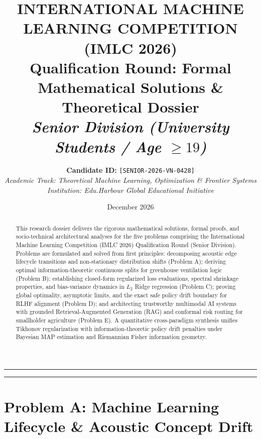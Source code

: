 \documentclass[11pt,a4paper]{article}
\title{\vspace{-1.2cm}\Large\textbf{INTERNATIONAL MACHINE LEARNING COMPETITION (IMLC 2026)}\\[0.3cm]
\large\textbf{Qualification Round: Formal Mathematical Solutions \& Theoretical Dossier}\\[0.1cm]
\normalsize\textit{Senior Division (University Students / Age $\ge 19$)}}
\author{\textbf{Candidate ID:} \texttt{[SENIOR-2026-VN-0428]} \\
\textit{Academic Track: Theoretical Machine Learning, Optimization \& Frontier Systems} \\
\textit{Institution: Edu.Harbour Global Educational Initiative}}
\date{December 2026}
\theoremstyle{definition}
\theoremstyle{plain}
\theoremstyle{remark}
\begin{document}
\maketitle
\thispagestyle{fancy}

\begin{abstract}
This research dossier delivers the rigorous mathematical solutions, formal proofs, and socio-technical architectural analyses for the five problems comprising the International Machine Learning Competition (IMLC 2026) Qualification Round (Senior Division). Problems are formulated and solved from first principles: decomposing acoustic edge lifecycle transitions and non-stationary distribution shifts (Problem A); deriving optimal information-theoretic continuous splits for greenhouse ventilation logic (Problem B); establishing closed-form regularized loss evaluations, spectral shrinkage properties, and bias-variance dynamics in $L_2$ Ridge regression (Problem C); proving global optimality, asymptotic limits, and the exact safe policy drift boundary for RLHF alignment (Problem D); and architecting trustworthy multimodal AI systems with grounded Retrieval-Augmented Generation (RAG) and conformal risk routing for smallholder agriculture (Problem E). A quantitative cross-paradigm synthesis unifies Tikhonov regularization with information-theoretic policy drift penalties under Bayesian MAP estimation and Riemannian Fisher information geometry.
\end{abstract}

\vspace{0.2cm}
\hrule
\vspace{0.3cm}
\tableofcontents
\vspace{0.3cm}
\hrule
\vspace{0.5cm}

\section{Problem A: Machine Learning Lifecycle \& Acoustic Concept Drift}
\end{document}
